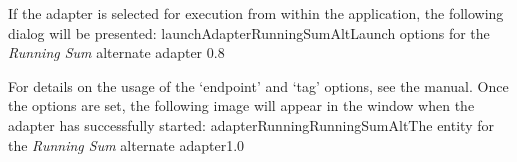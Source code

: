 \insertStandardAdapterCommands
\condPage{}
If the adapter is selected for execution from within the \emph{\MMMU} application, the
following dialog will be presented:
%
{launchAdapterRunningSumAlt}{Launch options for the \emph{Running Sum} alternate adapter}%
{0.8}

For details on the usage of the `endpoint' and `tag' options, see the \emph{\MMMU} manual.
Once the options are set, the following image will appear in the \emph{\MMMU} window when
the adapter has successfully started:
%
{adapterRunningRunningSumAlt}{The \emph{\MMMU} entity for the \emph{Running Sum} alternate
adapter}{1.0}
\secondaryEnd
\appendixEnd{}
